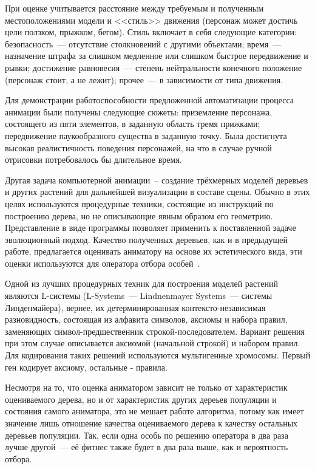При оценке учитывается расстояние между требуемым и полученным местоположениями модели и <<стиль>> движения (персонаж может достичь цели ползком, прыжком, бегом). Стиль включает в себя следующие категории: безопасность~--- отсутствие столкновений с другими объектами; время~--- назначение штрафа за слишком медленное или слишком быстрое передвижение и рывки; достижение равновесия~--- степень нейтральности конечного положение (персонаж стоит, а не лежит); прочее~--- в зависимости от типа движения.

Для демонстрации работоспособности предложенной автоматизации процесса анимации были получены следующие сюжеты: приземление персонажа, состоящего из пяти элементов, в заданную область тремя прижками; передвижение паукообразного существа в заданную точку. Была достигнута высокая реалистичность поведения персонажей, на что в случае ручной отрисовки потребовалось бы длительное время.

Другая задача компьютерной анимации~-- создание трёхмерных моделей деревьев и других растений для дальнейшей визуализации в составе сцены. Обычно в этих целях используются процедурные техники, состоящие из инструкций по построению дерева, но не описывающие явным образом его геометрию. Представление в виде программы позволяет применить к поставленной задаче эволюционный подход. Качество полученных деревьев, как и в предыдущей работе, предлагается оценивать аниматору на основе их эстетического вида, эти оценки используются для оператора отбора особей~\cite{conf/afrigraph/VenterH07}.

Одной из лучших процедурных техник для построения моделей растений являются L-системы (L-Systems~--- Lindnenmayer Systems~--- системы Линденмайера), вернее, их детерминированная контексто-независимая разновидность, состоящая из алфавита символов, аксиомы и набора правил, заменяющих символ-предшественник строкой-последователем. Вариант решения при этом случае описывается аксиомой (начальной строкой) и набором правил. Для кодирования таких решений используются мультигенные хромосомы. Первый ген кодирует аксиому, остальные - правила.

Несмотря на то, что оценка аниматором зависит не только от характеристик оцениваемого дерева, но и от характеристик других дереьев популяции и состояния самого аниматора, это не мешает работе алгоритма, потому как имеет значение лишь отношение качества оцениваемого дерева к качеству остальных деревьев популяции. Так, если одна особь по решению оператора в два раза лучше другой~--- её фитнес также будет в два раза выше, как и вероятность отбора.


